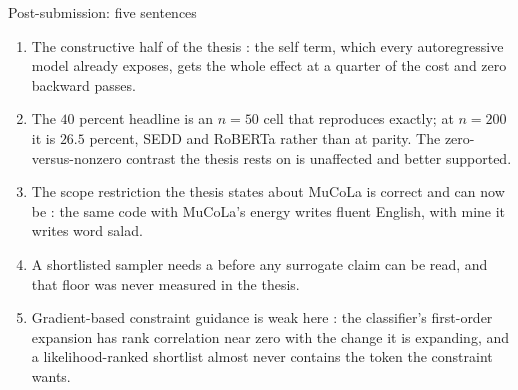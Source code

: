 \documentclass{beamer}
\begin{document}
\begin{frame}[noframenumbering]{Post-submission: five sentences}
  \small
  \begin{enumerate}\small
    \item The constructive half of the thesis : the self term,
      which every autoregressive model already exposes, gets the whole effect at a quarter of the
      cost and zero backward passes.
    \item The $40$ percent headline is an $n=50$ cell that reproduces exactly; at $n=200$ it is
      $26.5$ percent,  SEDD and RoBERTa rather than at parity. The
      zero-versus-nonzero contrast the thesis rests on is unaffected and better supported.
    \item The scope restriction the thesis states about MuCoLa is correct and can now be
      : the same code with MuCoLa's energy writes
      fluent English, with mine it writes word salad.
    \item A shortlisted sampler needs a  before any
      surrogate claim can be read, and that floor was never measured in the thesis.
    \item Gradient-based constraint guidance is weak here : the
      classifier's first-order expansion has rank correlation near zero with the change it is
      expanding, and a likelihood-ranked shortlist almost never contains the token the constraint
      wants.
  \end{enumerate}
\end{frame}
\end{document}
